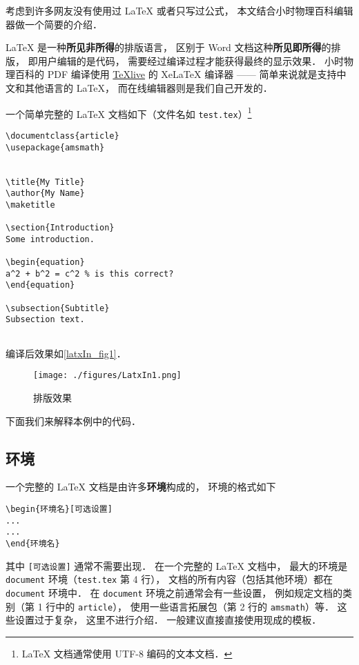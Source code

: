 
考虑到许多网友没有使用过 LaTeX 或者只写过公式， 本文结合小时物理百科编辑器做一个简要的介绍．

LaTeX 是一种\textbf{所见非所得}的排版语言， 区别于 Word 文档这种\textbf{所见即所得}的排版， 即用户编辑的是代码， 需要经过编译过程才能获得最终的显示效果． 小时物理百科的 PDF 编译使用 \href{https://www.tug.org/texlive/}{TeXlive} 的 XeLaTeX 编译器 —— 简单来说就是支持中文和其他语言的 LaTeX， 而在线编辑器则是我们自己开发的．

一个简单完整的 LaTeX 文档如下（文件名如 \lstinline|test.tex|）\footnote{LaTeX 文档通常使用 UTF-8 编码的文本文档．}
\begin{lstlisting}
\documentclass{article}
\usepackage{amsmath}


\title{My Title}
\author{My Name}
\maketitle

\section{Introduction}
Some introduction.

\begin{equation}
a^2 + b^2 = c^2 % is this correct?
\end{equation}

\subsection{Subtitle}
Subsection text.


\end{lstlisting}

编译后效果如\autoref{latxIn_fig1}．
\begin{figure}[ht]
\centering
\texttt{[image: ./figures/LatxIn1.png]}
\caption{排版效果} \label{latxIn_fig1}
\end{figure}
下面我们来解释本例中的代码．

\subsection{环境}
一个完整的 LaTeX 文档是由许多\textbf{环境}构成的， 环境的格式如下
\begin{lstlisting}
\begin{环境名}[可选设置]
...
...
\end{环境名}
\end{lstlisting}
其中 \lstinline|[可选设置]| 通常不需要出现． 在一个完整的 LaTeX 文档中， 最大的环境是 \lstinline|document| 环境（\lstinline|test.tex| 第 4 行）， 文档的所有内容（包括其他环境）都在 \lstinline|document| 环境中． 在 \lstinline|document| 环境之前通常会有一些设置， 例如规定文档的类别（第 1 行中的 \lstinline|article|）， 使用一些语言拓展包（第 2 行的 \lstinline|amsmath|）等． 这些设置过于复杂， 这里不进行介绍． 一般建议直接直接使用现成的模板．

